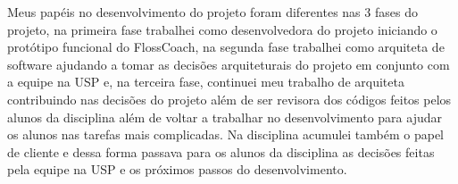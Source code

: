 Meus papéis no desenvolvimento do projeto foram diferentes nas 3 fases do projeto, na 
primeira fase trabalhei como desenvolvedora do projeto iniciando o protótipo funcional
do FlossCoach, na segunda fase trabalhei como arquiteta de software ajudando a tomar as
decisões arquiteturais do projeto em conjunto com a equipe na USP e, na terceira fase,
continuei meu trabalho de arquiteta contribuindo nas decisões do projeto além de ser
revisora dos códigos feitos pelos alunos da disciplina além de voltar a trabalhar no
desenvolvimento para ajudar os alunos nas tarefas mais complicadas. Na disciplina 
acumulei também o papel de cliente e dessa forma passava para os alunos da disciplina
as decisões feitas pela equipe na USP e os próximos passos do desenvolvimento. 


